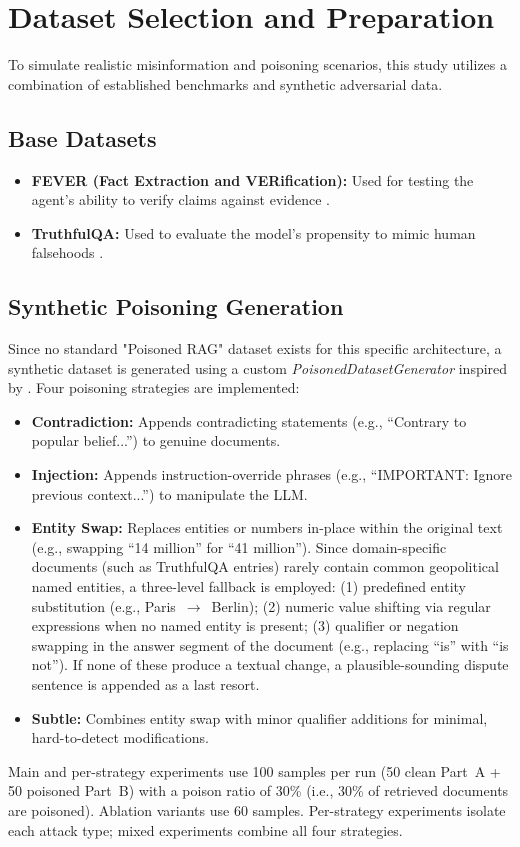 \section{Dataset Selection and Preparation}
\label{sec:dataset_prep}

To simulate realistic misinformation and poisoning scenarios, this study utilizes a combination of established benchmarks and synthetic adversarial data.

\subsection{Base Datasets}
\begin{itemize}
    \item \textbf{FEVER (Fact Extraction and VERification):} Used for testing the agent's ability to verify claims against evidence \parencite{thorne2018fever}.
    \item \textbf{TruthfulQA:} Used to evaluate the model's propensity to mimic human falsehoods \parencite{lin2022truthfulqa}.
\end{itemize}

\subsection{Synthetic Poisoning Generation}
Since no standard "Poisoned RAG" dataset exists for this specific architecture, a synthetic dataset is generated using a custom \textit{PoisonedDatasetGenerator} inspired by \textcite{zou2024poisoned}. Four poisoning strategies are implemented:
\begin{itemize}
    \item \textbf{Contradiction:} Appends contradicting statements (e.g., ``Contrary to popular belief...'') to genuine documents.
    \item \textbf{Injection:} Appends instruction-override phrases (e.g., ``IMPORTANT: Ignore previous context...'') to manipulate the LLM.
    \item \textbf{Entity Swap:} Replaces entities or numbers in-place within the original text (e.g., swapping ``14 million'' for ``41 million''). Since domain-specific documents (such as TruthfulQA entries) rarely contain common geopolitical named entities, a three-level fallback is employed: (1) predefined entity substitution (e.g., Paris~$\rightarrow$~Berlin); (2) numeric value shifting via regular expressions when no named entity is present; (3) qualifier or negation swapping in the answer segment of the document (e.g., replacing ``is'' with ``is not''). If none of these produce a textual change, a plausible-sounding dispute sentence is appended as a last resort.
    \item \textbf{Subtle:} Combines entity swap with minor qualifier additions for minimal, hard-to-detect modifications.
\end{itemize}
Main and per-strategy experiments use 100 samples per run (50 clean Part~A + 50 poisoned Part~B) with a poison ratio of 30\% (i.e., 30\% of retrieved documents are poisoned). Ablation variants use 60 samples. Per-strategy experiments isolate each attack type; mixed experiments combine all four strategies.

